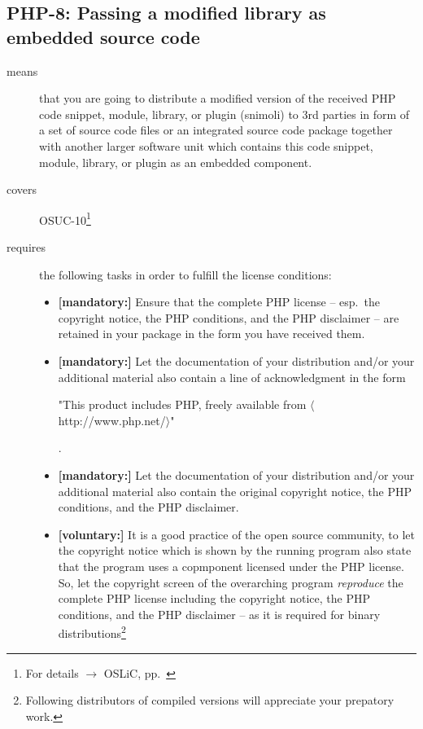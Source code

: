 \subsection{PHP-8: Passing a modified library as embedded source code}
\label{OSUC-10-PHP}
\begin{description}
\item[means] that you are going to distribute a modified version of the received
PHP code snippet, module, library, or plugin (snimoli) to 3rd parties in form
of a set of source code files or an integrated source code package together with
another larger software unit which contains this code snippet, module, library,
or plugin as an embedded component.
\item[covers] OSUC-10\footnote{For details $\rightarrow$ OSLiC, pp.\ \pageref{OSUC-10-DEF}}
\item[requires] the following tasks in order to fulfill the license conditions:
\begin{itemize}
  
  \item \textbf{[mandatory:]} Ensure that the complete PHP license -- esp.\
  the copyright notice, the PHP conditions, and the PHP disclaimer -- are
  retained in your package in the form you have received them.
  
  \item \textbf{[mandatory:]} Let the documentation of your distribution and/or
  your additional material also contain a line of acknowledgment in the form
   \begin{footnotesize}"This product includes PHP, freely available from
  $\langle$http://www.php.net/$\rangle$"\end{footnotesize}.
    
  \item \textbf{[mandatory:]} Let the documentation of your distribution and/or
  your additional material also contain the original copyright notice, the PHP
  conditions, and the PHP disclaimer.

  \item \textbf{[voluntary:]} It is a good practice of the open source
  community, to let the copyright notice which is shown by the running program
  also state that the program uses a copmponent licensed under the PHP license.
  So, let the copyright screen of the overarching program \emph{reproduce} the
  complete PHP license including the copyright notice, the PHP conditions, and
  the PHP disclaimer -- as it is required for binary
  distributions\footnote{Following distributors of compiled versions will
  appreciate your prepatory work.}
  

\end{itemize}
\end{description}
